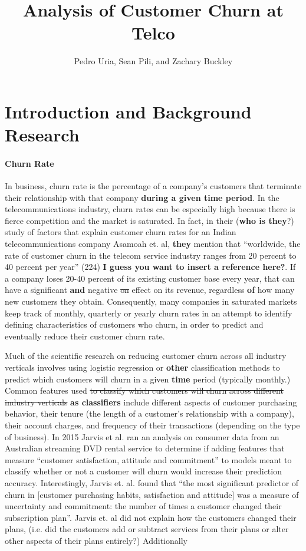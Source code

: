 \documentclass[man, floatsintext]{apa6}
\title{Analysis of Customer Churn at Telco}
\author{Pedro Uria, Sean Pili, and Zachary Buckley}
\affiliation{George Washington University}
\begin{document}
\maketitle

\section{Introduction and Background Research}
\paragraph{Churn Rate}

In business, churn rate is the percentage of a company's customers that terminate their relationship with that company \textbf{during a given time period}. In the telecommunications industry, churn rates can be especially high because there is fierce competition and the market is saturated. In fact, in their (\textbf{who is they}?) study of factors that explain customer churn rates for an Indian telecommunications company Asamoah et. al, \textbf{they} mention that ``worldwide, the rate of customer churn in the telecom service industry ranges from 20 percent to 40 percent per year'' (224) \textbf{I guess you want to insert a reference here?}. If a company loses 20-40 percent of its existing customer base every year, that can have a significant \textbf{and} negative \sout{on} effect on its revenue, regardless \textbf{of} how many new customers they obtain.  Consequently, many companies in saturated markets keep track of monthly, quarterly or yearly churn rates in an attempt to identify defining characteristics of customers who churn, in order to predict and eventually reduce their customer churn rate. 

Much of the scientific research on reducing customer churn across all industry verticals involves using logistic regression or \textbf{other} classification methods to predict which customers will churn in a given \textbf{time} period (typically monthly.) Common features used \sout{to classify which customers will churn across different industry verticals} \textbf{as classifiers} include different aspects of customer purchasing behavior, their tenure (the length of a customer's relationship with a company), their account charges,  and frequency of their transactions (depending on the type of business). In 2015 Jarvis et al. ran an analysis on consumer data from an Australian streaming DVD rental service to determine if adding features that measure ``customer satisfaction, attitude and commitment'' to models meant to classify whether or not a customer will churn would increase their prediction accuracy.  Interestingly, Jarvis et. al. found that ``the most significant predictor of churn in [customer purchasing habits, satisfaction and attitude] was a measure of uncertainty and commitment: the number of times a customer changed their subscription plan''. Jarvis et. al did not explain how the customers changed their plans, (i.e. did the customers add or subtract services from their plans or alter other aspects of their plans entirely?)  Additionally
\end{document}
